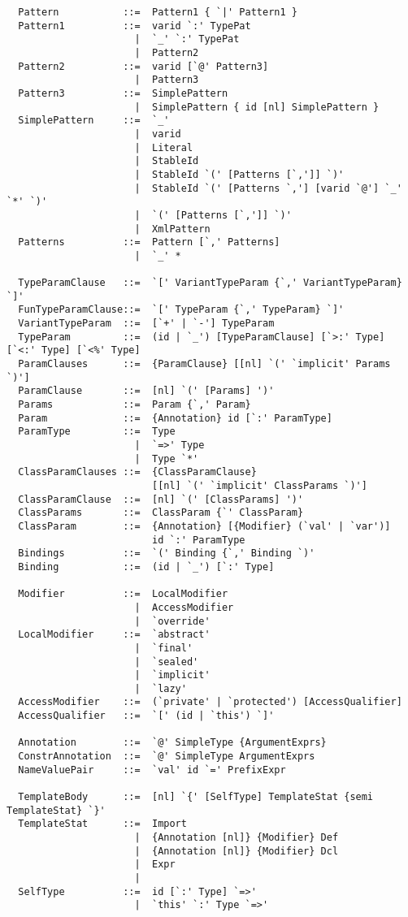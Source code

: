 {\begin{lstlisting}
  Pattern           ::=  Pattern1 { `|' Pattern1 }
  Pattern1          ::=  varid `:' TypePat
                      |  `_' `:' TypePat
                      |  Pattern2
  Pattern2          ::=  varid [`@' Pattern3]
                      |  Pattern3
  Pattern3          ::=  SimplePattern
                      |  SimplePattern { id [nl] SimplePattern }
  SimplePattern     ::=  `_'
                      |  varid
                      |  Literal
                      |  StableId
                      |  StableId `(' [Patterns [`,']] `)'
                      |  StableId `(' [Patterns `,'] [varid `@'] `_' `*' `)'
                      |  `(' [Patterns [`,']] `)'
                      |  XmlPattern
  Patterns          ::=  Pattern [`,' Patterns]
                      |  `_' *

  TypeParamClause   ::=  `[' VariantTypeParam {`,' VariantTypeParam} `]'
  FunTypeParamClause::=  `[' TypeParam {`,' TypeParam} `]'
  VariantTypeParam  ::=  [`+' | `-'] TypeParam
  TypeParam         ::=  (id | `_') [TypeParamClause] [`>:' Type] [`<:' Type] [`<%' Type]
  ParamClauses      ::=  {ParamClause} [[nl] `(' `implicit' Params `)']
  ParamClause       ::=  [nl] `(' [Params] ')'
  Params            ::=  Param {`,' Param}
  Param             ::=  {Annotation} id [`:' ParamType]
  ParamType         ::=  Type 
                      |  `=>' Type 
                      |  Type `*'
  ClassParamClauses ::=  {ClassParamClause} 
                         [[nl] `(' `implicit' ClassParams `)']
  ClassParamClause  ::=  [nl] `(' [ClassParams] ')'
  ClassParams       ::=  ClassParam {`' ClassParam}
  ClassParam        ::=  {Annotation} [{Modifier} (`val' | `var')] 
                         id `:' ParamType
  Bindings          ::=  `(' Binding {`,' Binding `)'
  Binding           ::=  (id | `_') [`:' Type]

  Modifier          ::=  LocalModifier 
                      |  AccessModifier
                      |  `override'
  LocalModifier     ::=  `abstract'
                      |  `final'
                      |  `sealed'
                      |  `implicit'
                      |  `lazy'
  AccessModifier    ::=  (`private' | `protected') [AccessQualifier]
  AccessQualifier   ::=  `[' (id | `this') `]'

  Annotation        ::=  `@' SimpleType {ArgumentExprs}
  ConstrAnnotation  ::=  `@' SimpleType ArgumentExprs
  NameValuePair     ::=  `val' id `=' PrefixExpr

  TemplateBody      ::=  [nl] `{' [SelfType] TemplateStat {semi TemplateStat} `}'
  TemplateStat      ::=  Import
                      |  {Annotation [nl]} {Modifier} Def
                      |  {Annotation [nl]} {Modifier} Dcl
                      |  Expr
                      |
  SelfType          ::=  id [`:' Type] `=>'
                      |  `this' `:' Type `=>' 


\end{lstlisting}}
